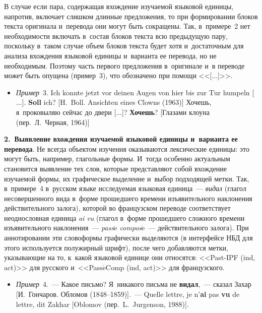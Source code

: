 \begin{multicols}{2}
В случае если пара, содержащая вхождение изуча\-емой языковой единицы, 
напротив, включает слишком длинные предложения, то при формировании 
блоков текста оригинала и~перевода они могут быть сокращены. Так, 
в~примере~2 нет необходимости включать в~состав блоков текста всю 
предыдущую пару, поскольку в~таком случае объем блоков текста будет хотя и~достаточным для анализа вхождения языковой единицы и~варианта ее 
перевода, но не необходимым. Поэтому часть первого предложения в~оригинале и~в переводе может быть опущена (пример~3), что обозначено при 
помощи <<[$\ldots$]>>.

\begin{itemize}
\item[\,] \textit{Пример}~3. Ich k$\ddot{\mbox{o}}$nnte jetzt vor deinen Augen von hier 
bis zur T$\ddot{\mbox{u}}$r humpeln [$\ldots$]. \textbf{Soll} ich? 
[H.~B$\ddot{\mbox{o}}$ll. Ansichten eines Clowns (1963)] Хочешь, я~проковыляю 
сейчас до двери [$\ldots$]? \textbf{Хочешь}? [Глазами клоуна (пер.\ Л.~Черная, 
1964)]
\end{itemize}

\textbf{2.\ Выявление вхождения изучаемой языковой единицы 
и~варианта ее перевода}. Не всегда объектом изучения оказываются 
лексические единицы: это могут быть, например, глагольные формы. 
И~тогда особенно актуальным становится выявление тех слов, которые 
представляют собой вхождение изуча\-емой формы, их графическое 
выделение и~выбор подходящей метки. Так, в~примере~4 в~русском языке 
исследуемая языковая единица~--- \textit{видал} (глагол несовершенного 
вида в~форме прошедшего времени изъявительного наклонения 
действительного залога), которой во французском переводе соответствует 
неоднословная единица \textit{ai vu} (глагол в~форме прошедшего сложного 
времени изъявительного наклонения~--- \textit{pass$\acute{\mbox{e}}$ 
compos$\acute{\mbox{e}}$}~--- действительного залога). При аннотировании 
эти словоформы графически выделяются (в интерфейсе НБД для этого 
используется полужирный шрифт), после чего добавляются метки, 
указывающие на то, к~какой языковой единице они относятся: <<Past-IPF 
(ind, act)>> для русского и~<<Pass$\acute{\mbox{e}}$Comp (ind, act)>> для 
французского.

\begin{itemize}
\item[\,] \textit{Пример}~4.~--- Какое письмо? Я~никакого письма не \textbf{видал},~--- 
сказал Захар [И.~Гончаров. Обломов (1848--1859)].~--- Quelle lettre, je n'\textbf{ai} pas 
\textbf{vu} de lettre, dit Zakhar [Oblomov (пер.\ L.~Jurgenson, 1988)].
\end{itemize}


\end{multicols}
